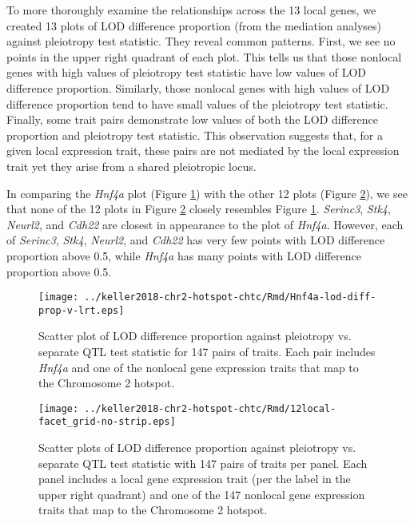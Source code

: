 \documentclass{book}
\begin{document}
To more thoroughly examine the relationships across the 13 local genes, we created 13 plots of LOD difference proportion (from the mediation analyses) against pleiotropy test statistic. They reveal common patterns. First, we see no points in the upper right quadrant of each plot. This tells us that those nonlocal genes with high values of pleiotropy test statistic have low values of LOD difference proportion. Similarly, those nonlocal genes with high values of LOD difference proportion tend to have small values of the pleiotropy test statistic. Finally, some trait pairs demonstrate low values of both the LOD difference proportion and pleiotropy test statistic. This observation suggests that, for a given local expression trait, these pairs are not mediated by the local expression trait yet they arise from a shared pleiotropic locus.

In comparing the \emph{Hnf4a} plot (Figure \ref{fig:hnf4a}) with the other 12 plots (Figure \ref{fig:nothnf4a-12}), we see that none of the 12 plots in Figure \ref{fig:nothnf4a-12} closely resembles Figure \ref{fig:hnf4a}. \emph{Serinc3}, \emph{Stk4}, \emph{Neurl2}, and \emph{Cdh22} are closest in appearance to the plot of \emph{Hnf4a}. However, each of \emph{Serinc3}, \emph{Stk4}, \emph{Neurl2}, and \emph{Cdh22} has very few points with LOD difference proportion above 0.5, while \emph{Hnf4a} has many points with LOD difference proportion above 0.5.

\begin{figure}
    \centering
    \texttt{[image: ../keller2018-chr2-hotspot-chtc/Rmd/Hnf4a-lod-diff-prop-v-lrt.eps]}
    \caption[LOD difference proportion vs. pleiotropy test statistic.]{Scatter plot of LOD difference proportion against pleiotropy vs. separate QTL test statistic for 147 pairs of traits. Each pair includes \emph{Hnf4a} and one of the nonlocal gene expression traits that map to the Chromosome 2 hotspot.}
    \label{fig:hnf4a}
\end{figure}

\begin{figure}
    \centering
    \texttt{[image: ../keller2018-chr2-hotspot-chtc/Rmd/12local-facet\_grid-no-strip.eps]}
    \caption[LOD difference proportion vs. pleiotropy test statistic from the per-local gene perspective.]{Scatter plots of LOD difference proportion against pleiotropy vs. separate QTL test statistic with 147 pairs of traits per panel. Each panel includes a local gene expression trait (per the label in the upper right quadrant) and one of the 147 nonlocal gene expression traits that map to the Chromosome 2 hotspot.}
    \label{fig:nothnf4a-12}
\end{figure}
\end{document}
